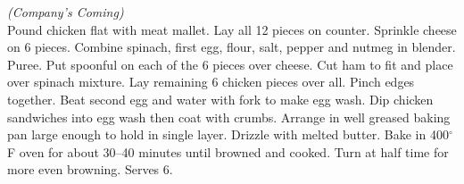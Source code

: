 \begin{minipage}{\linewidth}
\end{minipage}\par\begin{minipage}{\linewidth} 
\textit{(Company's Coming)}\\
{Pound chicken flat with meat mallet. Lay all 12 pieces on counter. Sprinkle cheese on 6 pieces. Combine spinach, first egg, flour, salt, pepper and nutmeg in blender. Puree. Put spoonful on each of the 6 pieces over cheese. Cut ham to fit and place over spinach mixture. Lay remaining 6 chicken pieces over all. Pinch edges together. Beat second egg and water with fork to make egg wash. Dip chicken sandwiches into egg wash then coat with crumbs. Arrange in well greased baking pan large enough to hold in single layer. Drizzle with melted butter. Bake in 400$^\circ$F oven for about 30--40 minutes until browned and cooked. Turn at half time for more even browning. Serves 6.}


\end{minipage}
